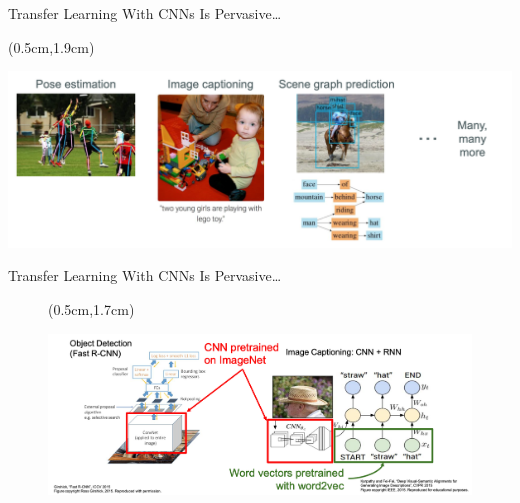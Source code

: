 \documentclass[serif, aspectratio=169]{beamer}
\begin{document}
\begin{frame}{Transfer Learning With CNNs Is Pervasive…}
	\begin{textblock*}{5cm}(0.5cm,1.9cm) %
		\begin{center}
			\includegraphics[keepaspectratio, scale=0.31]{pic/TL_examples}
		\end{center}
	\end{textblock*}
\end{frame}

\begin{frame}{Transfer Learning With CNNs Is Pervasive…}
	\begin{figure}[htpb]
		\begin{textblock*}{2cm}(0.5cm,1.7cm) %
			\begin{center}
				\includegraphics[keepaspectratio, scale=0.29]{pic/TL_examples2}
			\end{center}
		\end{textblock*}
	\end{figure}
\end{frame}
\end{document}
